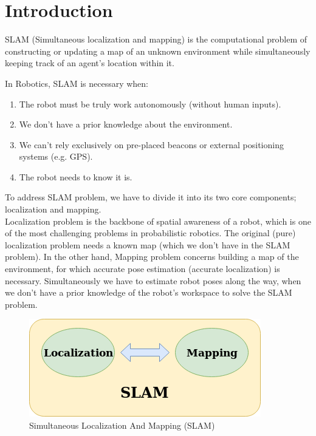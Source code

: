 \documentclass[a4paper,12pt]{article}
\begin{document}



\newpage
\tableofcontents

\newpage
\listoffigures

\newpage
\section{Introduction}

SLAM (Simultaneous localization and mapping) is the computational problem of constructing or updating a map of an unknown environment while simultaneously keeping track of an agent's location within it.

In Robotics, SLAM is necessary when:
\begin{enumerate}
    \item The robot must be truly work autonomously (without human inputs).
    \item We don't have a prior knowledge about the environment.
    \item We can't rely exclusively on pre-placed beacons or external positioning systems (e.g. GPS).
    \item The robot needs to know it is.
\end{enumerate}

To address SLAM problem, we have to divide it into its two core components; localization and mapping.\\
Localization problem is the backbone of spatial awareness of a robot, which is one of the most challenging problems in probabilistic robotics. The original (pure) localization problem needs a known map (which we don't have in the SLAM problem). In the other hand, Mapping problem concerns building a map of the environment, for which accurate pose estimation (accurate localization) is necessary. Simultaneously we have to estimate robot poses along the way, when we don't have a prior knowledge of the robot's workspace to solve the SLAM problem.
\begin{figure}[H]
    \centering
    \includegraphics[width=\textwidth]{img/slam.png}
    \caption{Simultaneous Localization And Mapping (SLAM)}
    \label{fig:slam}
\end{figure}
\end{document}
